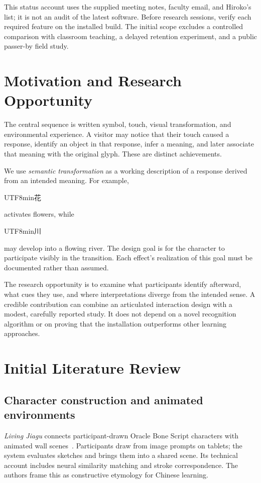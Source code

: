 \documentclass[11pt,letterpaper]{article}
\newcommand{\kanji}[1]{\begin{CJK}{UTF8}{min}#1\end{CJK}}
\begin{document}
This status account uses the supplied meeting notes, faculty email, and Hiroko's list; it is not an audit of the latest software. Before research sessions, verify each required feature on the installed build. The initial scope excludes a controlled comparison with classroom teaching, a delayed retention experiment, and a public passer-by field study.

\section{Motivation and Research Opportunity}
The central sequence is written symbol, touch, visual transformation, and environmental experience. A visitor may notice that their touch caused a response, identify an object in that response, infer a meaning, and later associate that meaning with the original glyph. These are distinct achievements.

We use \emph{semantic transformation} as a working description of a response derived from an intended meaning. For example, \kanji{花} activates flowers, while \kanji{川} may develop into a flowing river. The design goal is for the character to participate visibly in the transition. Each effect's realization of this goal must be documented rather than assumed.

The research opportunity is to examine what participants identify afterward, what cues they use, and where interpretations diverge from the intended sense. A credible contribution can combine an articulated interaction design with a modest, carefully reported study. It does not depend on a novel recognition algorithm or on proving that the installation outperforms other learning approaches.

\section{Initial Literature Review}
\subsection{Character construction and animated environments}
\emph{Living Jiagu} connects participant-drawn Oracle Bone Script characters with animated wall scenes~\cite{cheng2020}. Participants draw from image prompts on tablets; the system evaluates sketches and brings them into a shared scene. Its technical account includes neural similarity matching and stroke correspondence. The authors frame this as constructive etymology for Chinese learning.
\end{document}
